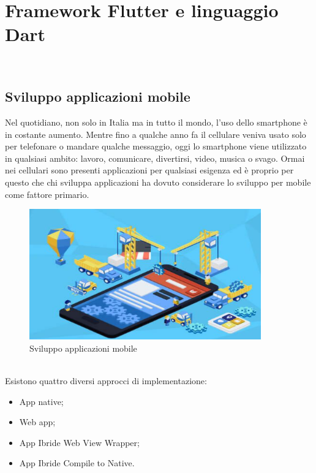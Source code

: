 
\chapter{Framework Flutter e linguaggio Dart}
\label{cap:Framework Flutter e linguaggio Dart}

\\

\section{Sviluppo applicazioni mobile}
Nel quotidiano, non solo in Italia ma in tutto il mondo, l'uso dello smartphone è in costante aumento.
Mentre fino a qualche anno fa il cellulare veniva usato solo per telefonare o mandare qualche messaggio, oggi lo smartphone viene utilizzato in qualsiasi ambito: lavoro, comunicare, divertirsi, video, musica o svago.
Ormai nei cellulari sono presenti applicazioni per qualsiasi esigenza ed è proprio per questo che chi sviluppa applicazioni ha dovuto considerare lo sviluppo per mobile come fattore primario.\\
	\begin{figure}[htbp]	
	\centering
	\includegraphics[width=10cm]{immagini/sviluppoapp.png}
	\caption{Sviluppo applicazioni mobile}
	\label{fig:Sviluppo applicazioni mobile}
\end{figure}
\\
Esistono quattro diversi approcci di implementazione:
\begin{itemize}
	\item App native; 
	\item Web app; 
	\item App Ibride Web View Wrapper; 
	\item App Ibride Compile to Native.
\end{itemize}

